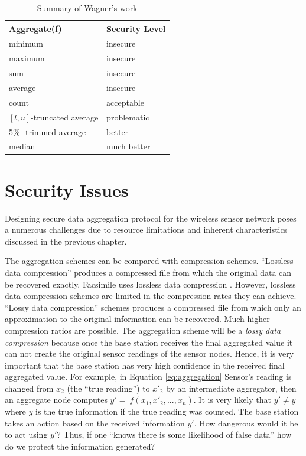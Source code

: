 	\begin{table}[!htb]	
		\begin{center}
			\begin{tabular}{ |l| l| }
				\hline
			    Aggregate(f) & Security Level \\
			    \hline
			    minimum & insecure \\
			    maximum & insecure \\
			    sum & insecure \\
				average & insecure \\
				count & acceptable \\
				$[l,u]$-truncated average & problematic \\
				5\% -trimmed average & better \\
				median & much better \\
			    \hline
			\end{tabular}
		\end{center}
		 \caption{Summary of Wagner's work}
		 \label{table:wagner}
	\end{table}

\section{Security Issues}
	\label{sec:security-issues}
	Designing secure data aggregation protocol for the wireless sensor network poses a numerous challenges due to resource limitations and inherent characteristics discussed in the previous chapter. 

	The aggregation schemes can be compared with compression schemes.
	``Lossless data compression'' produces a compressed file from which the original data can be recovered exactly.
	Facsimile uses lossless data compression \cite{alberto2000communication}.
	However, lossless data compression schemes are limited in the compression rates they can achieve.
	``Lossy data compression'' schemes produces a compressed file from which only an approximation to the original information can be recovered. Much higher compression ratios are possible.
	The aggregation scheme will be a \textit{lossy data compression} because once the base station receives the final aggregated value it can not create the original sensor readings of the sensor nodes.
	Hence, it is very important that the base station has very high confidence in the received final aggregated value. 
	For example, in Equation \ref{eq:aggregation} Sensor's reading is changed from $x_{2}$ (the ``true reading'') to $x'_{2}$ by an intermediate aggregator, then an aggregate node computes $y' =\ f(x_{1},x'_{2},...,x_{n})$.
	It is very likely that $y' \neq y$ where $y$ is the true information if the true reading was counted.
	The base station takes an action based on the received information $y'$.
	How dangerous would it be to act using $y'$?
	Thus, if one ``knows there is some likelihood of false data'' how do we protect the information generated?
	
